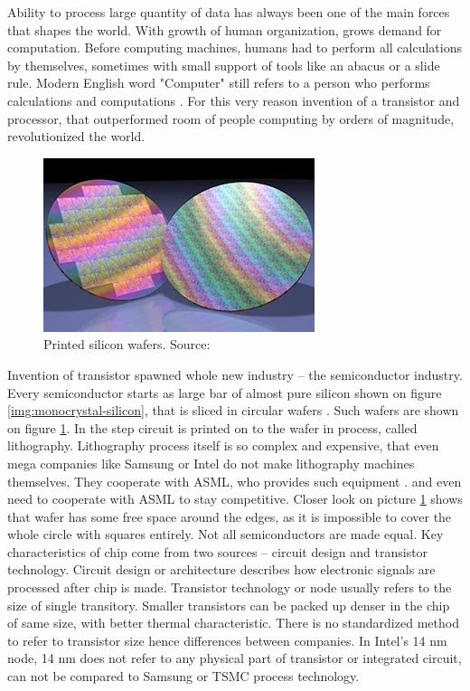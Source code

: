 \documentclass[a4paper,12pt]{article}
\begin{document}
Ability to process large quantity of data has always been one of the main forces that shapes the world.
With growth of human organization, grows demand for computation.
Before computing machines, humans had to perform all calculations by themselves, sometimes with small support of tools like an abacus or a slide rule. 
Modern English word "Computer" still refers to a person who performs calculations and computations \cite{DictioanryComputer}.
For this very reason invention of a transistor and  processor, that outperformed room of people computing by orders of magnitude, revolutionized the world.
\begin{figure}
    \includegraphics[width=0.9\linewidth]{silicon_waffers.png}
    \caption{Printed silicon wafers. Source: \cite{hitachiHightechManufactering}}
    \label{img:silicon-waffers}
\end{figure}
Invention of transistor spawned whole new industry -- the semiconductor industry. 
Every semiconductor starts as large bar of almost pure silicon shown on figure \ref{img:monocrystal-silicon}, that is sliced in circular wafers \cite{ASMLSemiconductorProduction}.
Such wafers are shown on figure \ref{img:silicon-waffers}.
In the step circuit is printed on to the wafer in process, called lithography.
Lithography process itself is so complex and expensive, that  even mega companies like Samsung or Intel do not make lithography machines themselves.
They cooperate with ASML, who provides such equipment  \cite{ASMLAnnualReport}.
and even need to cooperate with ASML to stay competitive.
Closer look on picture \ref{img:silicon-waffers} shows that wafer has some free space around the edges, as it is impossible to cover the whole circle with squares entirely.  
Not all semiconductors are made equal. 
Key characteristics of chip come from two sources -- circuit design and transistor technology. 
Circuit design or architecture describes how electronic signals are processed after chip is made. 
Transistor technology or node usually refers to the size of single transitory. 
Smaller transistors can be packed up denser in the chip of same size, with better thermal characteristic.  
There is no standardized method to refer to transistor size hence differences between companies.
In Intel's 14 nm node, 14 nm does not refer to any physical part of transistor or integrated circuit, can not be compared to Samsung or TSMC process technology.
\end{document}
